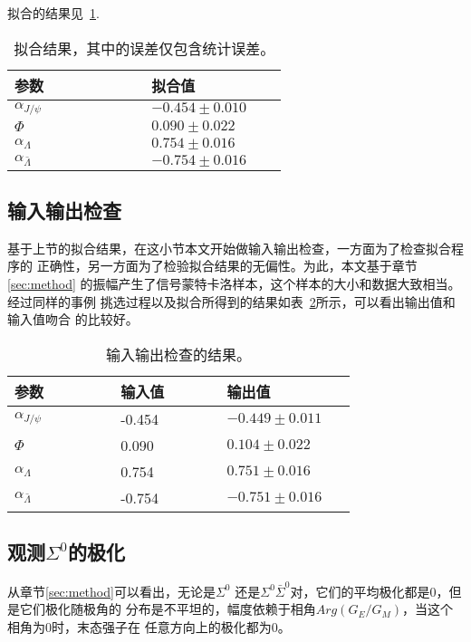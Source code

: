 拟合的结果见~\ref{tab:result}.

\begin{table}[htbp]
    \caption{拟合结果，其中的误差仅包含统计误差。}%
    \label{tab:result}
    \begin{center}
        \begin{tabular} {p{0.4\linewidth} p{0.4\linewidth}}
            \toprule
            参数 & 拟合值\\ 
            \midrule 
            $\alpha_{J/\psi}$ &  $-0.454 \pm 0.010$ \\ 
            $\Phi$   &  $0.090 \pm 0.022$ \\
            $\alpha_{\Lambda}$ & $0.754 \pm 0.016$ \\
            $\alpha_{\bar{\Lambda}}$ & $-0.754 \pm 0.016$ \\
            \bottomrule
        \end{tabular}
    \end{center}
\end{table}


\subsection{输入输出检查}
基于上节的拟合结果，在这小节本文开始做输入输出检查，一方面为了检查拟合程序的
正确性，另一方面为了检验拟合结果的无偏性。为此，本文基于章节\ref{sec:method}
的振幅产生了信号蒙特卡洛样本，这个样本的大小和数据大致相当。经过同样的事例
挑选过程以及拟合所得到的结果如表~\ref{tab:IO}所示，可以看出输出值和输入值吻合
的比较好。

\begin{table}[htbp]
    \caption{输入输出检查的结果。}%
    \label{tab:IO}
    \centering
    \begin{tabular} {p{0.25 \linewidth} p{0.25 \linewidth} p{0.25 \linewidth}}
        \toprule 
        参数 & 输入值 & 输出值  \\
        \midrule 
        $\alpha_{J/\psi}$        & -0.454 & $-0.449 \pm 0.011$  \\
        $\Phi$                   &  0.090  & $0.104 \pm 0.022$ \\
        $\alpha_{\Lambda}$       & 0.754  & $0.751 \pm 0.016$ \\
        $\alpha_{\bar{\Lambda}}$ & -0.754 & $-0.751 \pm 0.016$ \\
        \bottomrule
    \end{tabular}
\end{table}

\subsection{观测$\Sigma^{0}$的极化}
从章节\ref{sec:method}可以看出，无论是$\Sigma^{0}$
还是$\Sigma^{0}\bar{\Sigma}^{0}$对，它们的平均极化都是0，但是它们极化随极角的
分布是不平坦的，幅度依赖于相角$Arg(G_{E}/G_{M})$，当这个相角为0时，末态强子在
任意方向上的极化都为0。

